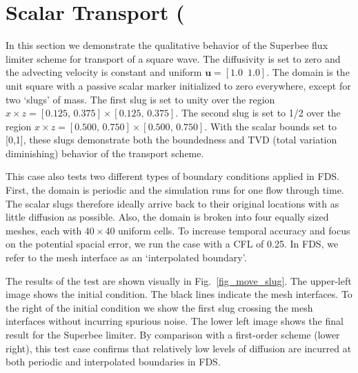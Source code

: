 \documentclass[11pt]{book}
\begin{document}
\clearpage

\section{Scalar Transport (\texorpdfstring{})}

In this section we demonstrate the qualitative behavior of the Superbee flux limiter scheme for transport of a square wave.
The diffusivity is set to zero and the advecting velocity is constant and uniform $\mathbf{u} = [1.0\,\,\,1.0]$.
The domain is the unit square with a passive scalar marker initialized to zero everywhere, except for two `slugs' of mass.
The first slug is set to unity over the region $x \times z = [0.125,\,0.375] \times [0.125,\,0.375]$.
The second slug is set to 1/2 over the region $x \times z = [0.500,\,0.750] \times [0.500,\,0.750]$.
With the scalar bounds set to [0,1], these slugs demonstrate both the boundedness and TVD (total variation diminishing) behavior of the transport scheme.

This case also tests two different types of boundary conditions applied in FDS.  First, the domain is periodic and the simulation runs for one flow through time.
The scalar slugs therefore ideally arrive back to their original locations with as little diffusion as possible.
Also, the domain is broken into four equally sized meshes, each with $40 \times 40$ uniform cells.
To increase temporal accuracy and focus on the potential spacial error, we run the case with a CFL of 0.25.  In FDS, we refer to the mesh interface as an `interpolated boundary'.

The results of the test are shown visually in Fig.~\ref{fig_move_slug}.  The upper-left image shows the initial condition.
The black lines indicate the mesh interfaces.  To the right of the initial condition we show the first slug crossing the mesh interfaces without incurring spurious noise.
The lower left image shows the final result for the Superbee limiter.  By comparison with a first-order scheme (lower right),
this test case confirms that relatively low levels of diffusion are incurred at both periodic and interpolated boundaries in FDS.
\end{document}
